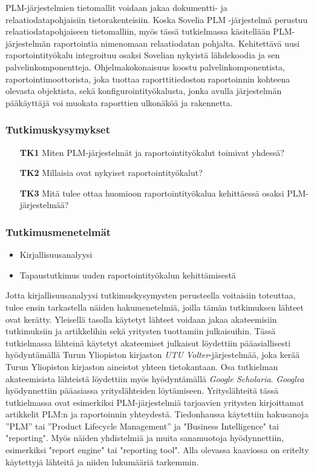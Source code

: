 PLM-järjestelmien tietomallit voidaan jakaa dokumentti- ja relaatiodatapohjaisiin tietorakenteisiin. \cite{david_what_2016} Koska Sovelia PLM -järjestelmä perustuu relaatiodatapohjaiseen tietomalliin, myös tässä tutkielmassa käsitellään PLM-järjestelmän raportointia nimenomaan relaatiodatan pohjalta. Kehitettävä uusi raportointityökalu integroituu osaksi Sovelian nykyistä lähdekoodia ja sen palvelinkomponentteja. Ohjelmakokonaisuus koostu palvelinkomponentista, raportointimoottorista, joka tuottaa raporttitiedoston raportoinnin kohteena olevasta objektista, sekä konfigurointityökalusta, jonka avulla järjestelmän pääkäyttäjä voi muokata raporttien ulkonäköä ja rakennetta.

\subsubsection{Tutkimuskysymykset}
\begin{itemize}
\item[\textbf{TK1}] Miten PLM-järjestelmät ja raportointityökalut toimivat yhdessä?
\item[\textbf{TK2}] Millaisia ovat nykyiset raportointityökalut?
\item[\textbf{TK3}] Mitä tulee ottaa huomioon raportointityökalua kehittäessä osaksi PLM-järjestelmää?
\end{itemize}

\subsubsection{Tutkimusmenetelmät}
\begin{itemize}
\item Kirjallisuusanalyysi
\item Tapaustutkimus uuden raportointityökalun kehittämisestä
\end{itemize}

Jotta kirjallisuusanalyysi tutkimuskysymysten perusteella voitaisiin toteuttaa, tulee ensin tarkastella näiden hakumenetelmiä, joilla tämän tutkimuksen lähteet ovat kerätty. Yleisellä tasolla käytetyt lähteet voidaan jakaa akateemisiin tutkimuksiin ja artikkelihin sekä yritysten tuottamiin julkaisuihin. Tässä tutkielmassa lähteinä käytetyt akateemiset julkaisut löydettiin pääasiallisesti hyödyntämällä Turun Yliopiston kirjaston \textit{UTU Volter}-järjestelmää, joka kerää Turun Yliopiston kirjaston aineistot yhteen tietokantaan. Osa tutkielman akateemisista lähteistä löydettiin myös hyödyntämällä \textit{Google Scholaria}. \textit{Googlea} hyödynnettiin pääasiassa yrityslähteiden löytämiseen. Yrityslähteitä tässä tutkielmassa ovat esimerkiksi PLM-järjestelmiä tarjoavien yritysten kirjoittamat artikkelit PLM:n ja raportoinnin yhteydestä. Tiedonhaussa käytettiin hakusanoja ”PLM” tai ”Product Lifecycle Management” ja "Business Intelligence" tai "reporting". Myös näiden yhdistelmiä ja muita sanamuotoja hyödynnettiin, esimerkiksi "report engine" tai "reporting tool". Alla olevassa kaaviossa on eritelty käytettyjä lähteitä ja niiden lukumääriä tarkemmin.

